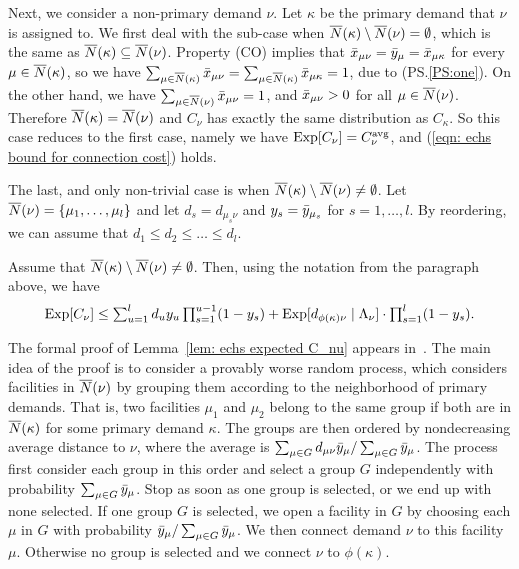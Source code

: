 Next, we consider a non-primary demand $\nu$. Let $\kappa$
be the primary demand that $\nu$ is assigned to. We first
deal with the sub-case when ${\overline{N}}(\kappa)\setminus
{\overline{N}}(\nu) = \emptyset$, which is the same as
${\overline{N}}(\kappa) \subseteq {\overline{N}}(\nu)$. Property (CO)
implies that ${\bar x}_{\mu\nu} = {\bar y}_{\mu} =
{\bar x}_{\mu\kappa}$ for every $\mu \in {\overline{N}}(\kappa)$, so we
have $\sum_{\mu\in{\overline{N}}(\kappa)} {\bar x}_{\mu\nu} =
\sum_{\mu\in{\overline{N}}(\kappa)} {\bar x}_{\mu\kappa} = 1$, due to
(PS.\ref{PS:one}). On the other hand, we have
$\sum_{\mu\in{\overline{N}}(\nu)} {\bar x}_{\mu\nu} = 1$, and
${\bar x}_{\mu\nu} > 0$ for all $\mu\in {\overline{N}}(\nu)$. Therefore
${\overline{N}}(\kappa) = {\overline{N}}(\nu)$ and $C_\nu$ has exactly the
same distribution as $C_\kappa$.  So this case reduces to
the first case, namely we have $\mbox{\rm Exp}[C_{\nu}] =
C^{{\mbox{\scriptsize\rm avg}}}_{\nu}$, and (\ref{eqn: echs bound for connection
  cost}) holds.

The last, and only non-trivial case is when
${\overline{N}}(\kappa)\setminus {\overline{N}}(\nu)\neq\emptyset$.  Let ${\overline{N}}(\nu)
= { \left\{ \mu_1,\ldots,\mu_l \right\} }$ and let $d_s = d_{\mu_s\nu}$ and $y_s =
{\bar y}_{\mu_s}$ for $s = 1,\ldots,l$. By reordering, we can assume that
$d_1 \le d_2 \le \ldots \le d_l$. 


\begin{lemma}\label{lem: echs expected C_nu}
Assume that ${\overline{N}}(\kappa) \setminus {\overline{N}}(\nu) \neq \emptyset$. Then, using the notation from
the paragraph above, we have
%
\begin{equation*}
	\textstyle
  \mbox{\rm Exp}[C_\nu] \leq 
	\sum_{u=1}^l d_uy_u\prod_{s=1}^{u-1}(1-y_s)
		+  \mbox{\rm Exp}[ d_{\phi(\kappa)\nu} \mid \Lambda_\nu]\cdot \textstyle{\prod_{s=1}^{l}} (1-y_{s}).	
\end{equation*}
\end{lemma}

The formal proof of Lemma~\ref{lem: echs expected C_nu}
appears in~\cite{ChudakS04}. The main idea of the proof is
to consider a provably worse random process, which considers
facilities in ${\overline{N}}(\nu)$ by grouping them according to
the neighborhood of primary demands. That is, two facilities
$\mu_1$ and $\mu_2$ belong to the same group if both are in
${\overline{N}}(\kappa)$ for some primary demand $\kappa$. The
groups are then ordered by nondecreasing average distance to
$\nu$, where the average is $\sum_{\mu\in G} d_{\mu\nu}
{\bar y}_{\mu} / \sum_{\mu\in G} {\bar y}_{\mu}$. The process
first consider each group in this order and select a group
$G$ independently with probability $\sum_{\mu\in
  G}{\bar y}_{\mu}$. Stop as soon as one group is selected, or
we end up with none selected. If one group $G$ is selected,
we open a facility in $G$ by choosing each $\mu$ in $G$ with
probability ${\bar y}_{\mu}/\sum_{\mu\in G} {\bar y}_{\mu}$. We
then connect demand $\nu$ to this facility $\mu$. Otherwise
no group is selected and we connect $\nu$ to $\phi(\kappa)$.

